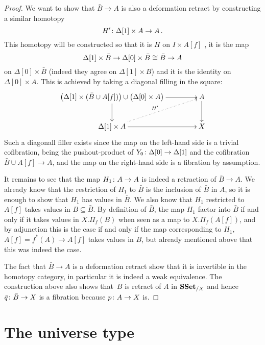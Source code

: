\documentclass[reqno,10pt,a4paper,oneside,draft]{amsart}
\begin{document}
\begin{proof}
We want to show that $\bar{B} \rightarrow A$ is also a deformation retract by constructing a similar homotopy 
\[
H' \colon \Delta[1] \times A \rightarrow A \, .
\] 
This homotopy will be constructed so that it is $H$ on $I \times A[f]$ ,  it is the map 
\[
\Delta[1] \times \bar{B} \rightarrow \Delta[0]  \times \bar{B} \cong \bar{B} \rightarrow A
\] 
on $\Delta[0] \times \bar{B} $ (indeed they agree on $\Delta[1] \times B$) and it is the identity on $\Delta[0] \times A$.  This is achieved by taking a diagonal filling in the square:
\[
\xymatrix@C=1.5cm{
\big( \Delta[1] \times (\bar{B} \cup A[f]) \big)  \cup \big( \Delta[0] \times A \big) \ar[d] \ar[r] & A \ar[d] \\
\Delta[1] \times A \ar[r] \ar@{.>}[ur]^{H'} & X
}\]
Such a diagonall filler exists since the map on the left-hand side is a trivial cofibration, being the 
 pushout-product of $Y_0 \colon \Delta[0] \rightarrow \Delta[1]$ and the cofibration $\bar{B} \cup A[f] \rightarrow A$, and the map on the right-hand side is a fibration by assumption.

It remains to see that the map $H_{1} \colon A \rightarrow A$ is indeed a retraction of $\bar{B} \rightarrow A$. We already know that the restriction of $H_{1}$ to $\bar{B}$ is  the inclusion of $\bar{B}$ in $A$, so it is enough to show that $H_{1}$ has values in $\bar{B}$. We also know that $H_{1}$ restricted to $A[f]$ takes values in $B \subseteq \bar{B}$. By definition of $\bar{B}$, the map $H_1$ factor into $\bar{B}$ if and only if it takes values in $X.\Pi_f(B)$ when seen as a map to $X.\Pi_f(A[f])$, and by adjunction this is the case if and only if the map corresponding to $H_1$, $A[f]= f^*(A) \rightarrow A[f]$ takes values in $B$, but already mentioned above that this was indeed the case.

The fact that $\bar{B} \rightarrow A$ is a deformation retract show that it is invertible in the homotopy category, in particular it is indeed a weak equivalence. The construction above also shows that~$\bar{B}$ is retract of $A$ in $\mathbf{SSet}_{/X}$ and hence $\bar{q} \colon \bar{B} \rightarrow X$ is a fibration because $p \colon A \rightarrow X$ is.
\end{proof}

 

\section{The universe type}
\end{document}
